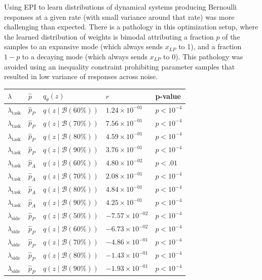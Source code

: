 \documentclass[11pt]{article}
\begin{document}
Using EPI to learn distributions of dynamical systems producing Bernoulli responses at a given rate (with small variance around that rate) was more challenging than expected.  
There is a pathology in this optimization setup, where the learned distribution of weights is bimodal attributing a fraction $p$ of the samples to an expansive mode (which always sends $x_{LP}$ to 1), and a fraction $1-p$ to a decaying mode (which always sends $x_{LP}$ to 0).  
This pathology was avoided using an inequality constraint prohibiting parameter samples that resulted in low variance of responses across noise.


\begin{table}[h]
\begin{tabular}{l|l|l|l|l}
$\lambda$  & $\hat{p}$ & $q_\theta(z)$ & $r$ & p-value \\ \hline
$\lambda_{\text{task}}$ & $\hat{p}_P$ & $q(z \mid \mathcal{B}(60\%))$ & $1.24 \times 10^{-01}$ & $p<10^{-4}$  \\ \hline
$\lambda_{\text{task}}$ & $\hat{p}_P$ & $q(z \mid \mathcal{B}(70\%))$ & $7.56 \times 10^{-01}$ & $p<10^{-4}$ \\ \hline
$\lambda_{\text{task}}$ & $\hat{p}_P$ & $q(z \mid \mathcal{B}(80\%))$ & $4.59 \times 10^{-01}$ & $p<10^{-4}$  \\ \hline
$\lambda_{\text{task}}$ & $\hat{p}_P$ & $q(z \mid \mathcal{B}(90\%))$ & $3.76 \times 10^{-01}$ & $p<10^{-4}$  \\ \hline

$\lambda_{\text{task}}$ & $\hat{p}_A$ & $q(z \mid \mathcal{B}(60\%))$ & $4.80 \times 10^{-02}$ & $p<.01$ \\ \hline
$\lambda_{\text{task}}$ & $\hat{p}_A$ & $q(z \mid \mathcal{B}(70\%))$ & $2.08 \times 10^{-01}$ & $p<10^{-4}$  \\ \hline
$\lambda_{\text{task}}$ & $\hat{p}_A$ & $q(z \mid \mathcal{B}(80\%))$ & $4.84 \times 10^{-01}$ & $p<10^{-4}$  \\ \hline
$\lambda_{\text{task}}$ & $\hat{p}_A$ & $q(z \mid \mathcal{B}(90\%))$ & $4.25 \times 10^{-01}$ & $p<10^{-4}$  \\ \hline

$\lambda_{\text{side}}$ & $\hat{p}_P$ & $q(z \mid \mathcal{B}(50\%))$ & $-7.57 \times 10^{-02}$ & $p<10^{-4}$  \\ \hline
$\lambda_{\text{side}}$ & $\hat{p}_P$ & $q(z \mid \mathcal{B}(60\%))$ & $-6.73 \times 10^{-02}$ & $p<10^{-4}$  \\ \hline
$\lambda_{\text{side}}$ & $\hat{p}_P$ & $q(z \mid \mathcal{B}(70\%))$ & $-4.86 \times 10^{-01}$ & $p<10^{-4}$  \\ \hline
$\lambda_{\text{side}}$ & $\hat{p}_P$ & $q(z \mid \mathcal{B}(80\%))$ & $-1.43 \times 10^{-01}$ & $p<10^{-4}$  \\ \hline
$\lambda_{\text{side}}$ & $\hat{p}_P$ & $q(z \mid \mathcal{B}(90\%))$ & $-1.93 \times 10^{-01}$ & $p<10^{-4}$  \\ \hline


\end{tabular}
\end{table}
\end{document}
